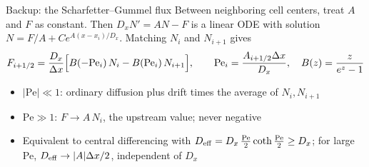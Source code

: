 \documentclass[aspectratio=169,10pt]{beamer}
\begin{document}
\begin{frame}{Backup: the Scharfetter--Gummel flux}
Between neighboring cell centers, treat $A$ and $F$ as constant. Then $D_x N' = AN - F$ is a linear ODE with solution $N = F/A + C e^{A(x-x_i)/D_x}$. Matching $N_i$ and $N_{i+1}$ gives
\[
F_{i+1/2} = \frac{D_x}{\Delta x}\Bigl[B(-\mathrm{Pe}_i)\,N_i - B(\mathrm{Pe}_i)\,N_{i+1}\Bigr],\qquad
\mathrm{Pe}_i = \frac{A_{i+1/2}\Delta x}{D_x},\quad B(z) = \frac{z}{e^z-1}
\]
\begin{itemize}
\item $|\mathrm{Pe}|\ll1$: ordinary diffusion plus drift times the average of $N_i, N_{i+1}$
\item $\mathrm{Pe}\gg1$: $F\to A\,N_i$, the upstream value; never negative
\item Equivalent to central differencing with $D_{\rm eff} = D_x\,\tfrac{\mathrm{Pe}}{2}\coth\tfrac{\mathrm{Pe}}{2}\ge D_x$; for large Pe, $D_{\rm eff}\to|A|\Delta x/2$, independent of $D_x$
\end{itemize}
\end{frame}
\end{document}
